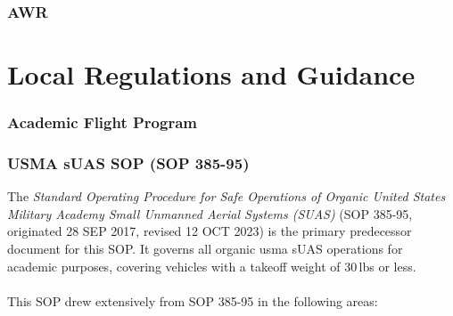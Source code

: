         \subsubsection{AWR}

    \section{Local Regulations and Guidance}
        \subsubsection{Academic Flight Program}
        \subsubsection{USMA sUAS SOP (SOP 385-95)}
        The \textit{Standard Operating Procedure for Safe Operations of Organic United States Military Academy Small Unmanned Aerial Systems (SUAS)} (SOP 385-95, originated 28 SEP 2017, revised 12 OCT 2023) is the primary predecessor document for this SOP.  It governs all organic \ac{usma} sUAS operations for academic purposes, covering vehicles with a takeoff weight of 30\,lbs or less. 
        
        \paragraph{}This SOP drew extensively from SOP 385-95 in the following areas:
        
